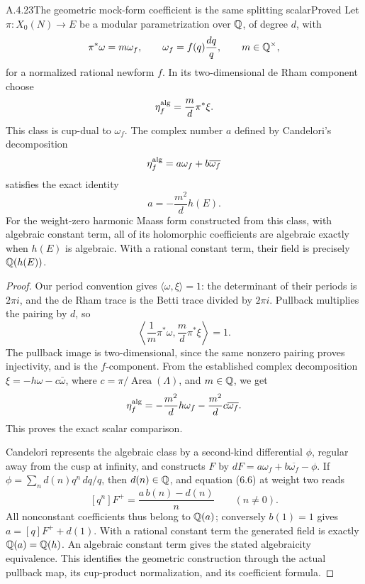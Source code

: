 \begin{result}{A.4.23}{The geometric mock-form coefficient is the same splitting scalar}{Proved}
Let $\pi:X_0(N)\to E$ be a modular parametrization over $\mathbb Q$, of degree $d$, with
\[
 \pi^*\omega=m\omega_f,\qquad
 \omega_f=f(q)\frac{dq}{q},\qquad m\in\mathbb Q^\times,
\]
for a normalized rational newform $f$. In its two-dimensional de Rham component choose
\[
 \eta_f^{\rm alg}=\frac m d\pi^*\xi.
\]
This class is cup-dual to $\omega_f$. The complex number $a$ defined by Candelori's decomposition
\[
 \eta_f^{\rm alg}=a\omega_f+b\overline{\omega_f}
\]
satisfies the exact identity
\[
 a=-\frac{m^2}{d}h(E).
\]
For the weight-zero harmonic Maass form constructed from this class, with algebraic constant term, all of its holomorphic coefficients are algebraic exactly when $h(E)$ is algebraic. With a rational constant term, their field is precisely $\mathbb Q(h(E))$.
\end{result}
\begin{proof}
Our period convention gives $\langle\omega,\xi\rangle=1$: the determinant of their periods is $2\pi i$, and the de Rham trace is the Betti trace divided by $2\pi i$. Pullback multiplies the pairing by $d$, so
\[
 \left\langle\frac1m\pi^*\omega,\frac m d\pi^*\xi\right\rangle=1.
\]
The pullback image is two-dimensional, since the same nonzero pairing proves injectivity, and is the $f$-component. From the established complex decomposition
$\xi=-h\omega-c\bar\omega$, where $c=\pi/\operatorname{Area}(\Lambda)$, and $m\in\mathbb Q$, we get
\[
 \eta_f^{\rm alg}
 =-\frac{m^2}{d}h\omega_f
 -\frac{m^2}{d}c\overline{\omega_f}.
\]
This proves the exact scalar comparison.

Candelori \cite[Section 6, equation (6.5), Proposition 6.2, and equation (6.6), pp.27--30]{EllCandelori2014} represents the algebraic class by a second-kind differential $\phi$, regular away from the cusp at infinity, and constructs $F$ by
$dF=a\omega_f+b\overline{\omega_f}-\phi$. If
$\phi=\sum_n d(n)q^n\,dq/q$, then $d(n)\in\mathbb Q$, and equation (6.6) at weight two reads
\[
 [q^n]F^+=\frac{a\,b(n)-d(n)}{n}\qquad(n\ne0).
\]
All nonconstant coefficients thus belong to $\mathbb Q(a)$; conversely $b(1)=1$ gives
$a=[q]F^++d(1)$. With a rational constant term the generated field is exactly $\mathbb Q(a)=\mathbb Q(h)$. An algebraic constant term gives the stated algebraicity equivalence. This identifies the geometric construction through the actual pullback map, its cup-product normalization, and its coefficient formula.
\end{proof}


